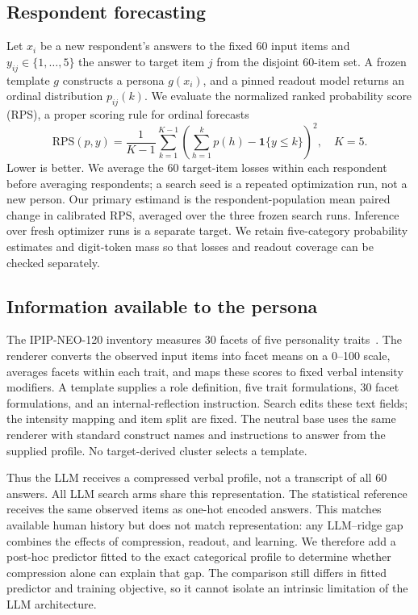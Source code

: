 \documentclass[sigconf,anonymous]{aamas}
\begin{document}
\subsection{Respondent forecasting}
Let $x_i$ be a new respondent's answers to the fixed 60 input items and
$y_{ij}\in\{1,\ldots,5\}$ the answer to target item $j$ from the disjoint
60-item set. A frozen template $g$ constructs a persona $g(x_i)$, and a pinned
readout model returns an ordinal distribution $p_{ij}(k)$. We evaluate the
normalized ranked probability score (RPS), a proper scoring
rule for ordinal forecasts~\cite{gneiting2007proper}
\begin{equation}
 \mathrm{RPS}(p,y)=\frac{1}{K-1}\sum_{k=1}^{K-1}
 \left(\sum_{h=1}^{k}p(h)-\mathbf 1\{y\leq k\}\right)^2,\quad K=5.
\end{equation}
Lower is better. We average the 60 target-item losses within each respondent
before averaging respondents; a search seed is a repeated optimization run,
not a new person. Our primary estimand is the respondent-population mean paired change in
calibrated RPS, averaged over the three frozen search runs. Inference over
fresh optimizer runs is a separate target.
We retain five-category probability estimates and digit-token mass so that
losses and readout coverage can be checked separately.

\subsection{Information available to the persona}
The IPIP-NEO-120 inventory measures 30 facets of five personality
traits~\cite{johnson2014ipip}. The renderer converts the observed input items
into facet means on a 0--100 scale, averages facets within each trait, and
maps these scores to fixed verbal intensity modifiers. A template supplies
a role definition, five trait formulations, 30 facet formulations, and an
internal-reflection instruction. Search edits these text fields; the
intensity mapping and item split are fixed. The neutral base uses the same
renderer with standard construct names and instructions to answer from the
supplied profile. No target-derived cluster selects a template.

Thus the LLM receives a compressed verbal profile, not a transcript of all
60 answers. All LLM search arms share this representation. The statistical
reference receives the same observed items as one-hot encoded answers.
This matches available human history but does not match representation:
any LLM--ridge gap combines the effects of compression, readout, and learning.
We therefore add a post-hoc predictor fitted to the exact categorical profile
to determine whether compression alone can explain that gap. The comparison
still differs in fitted predictor and training objective, so it cannot isolate
an intrinsic limitation of the LLM architecture.
\end{document}
